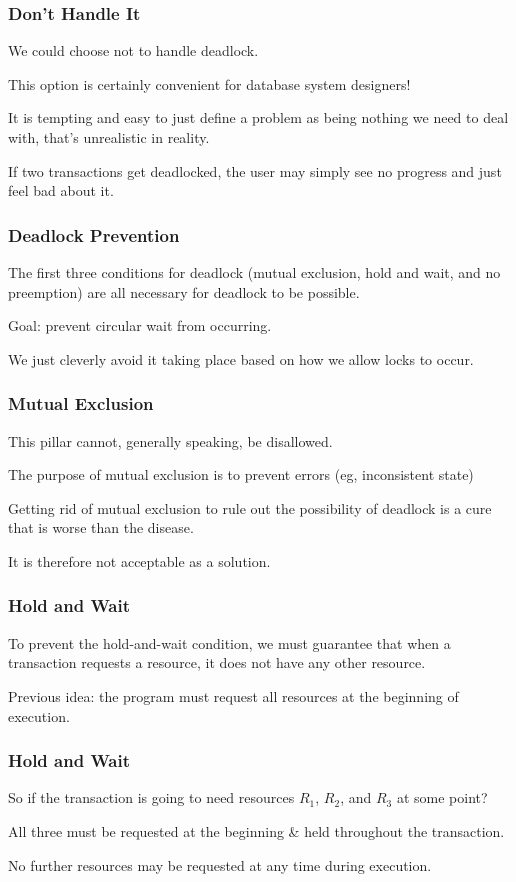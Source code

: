 \begin{frame}
\frametitle{Don't Handle It}

We could choose not to handle deadlock. 

This option is certainly convenient for database system designers! 

It is tempting and easy to just define a problem as being nothing we need to deal with, that's unrealistic in reality. 

If two transactions get deadlocked, the user may simply see no progress and just feel bad about it. 

\end{frame}

\begin{frame}
\frametitle{Deadlock Prevention}

The first three conditions for deadlock (mutual exclusion, hold and wait, and no preemption) are all necessary for deadlock to be possible. 

Goal: prevent circular wait from occurring.

We just cleverly avoid it taking place based on how we allow locks to occur.

\end{frame}

\begin{frame}
\frametitle{Mutual Exclusion}

This pillar cannot, generally speaking, be disallowed. 

The purpose of  mutual exclusion is to prevent errors (eg, inconsistent state)

Getting rid of mutual exclusion to rule out the possibility of deadlock is a cure that is worse than the disease. 

It is therefore not acceptable as a solution.


\end{frame}

\begin{frame}
\frametitle{Hold and Wait}
To prevent the hold-and-wait condition, we must guarantee that when a transaction requests a resource, it does not have any other resource. 

Previous idea: the program must request all resources at the beginning of execution.

\end{frame}

\begin{frame}
\frametitle{Hold and Wait}
So if the transaction is going to need resources $R_{1}$, $R_{2}$, and $R_{3}$ at some point?

All three must be requested at the beginning \& held throughout the transaction.

 No further resources may be requested at any time during execution.

\end{frame}


